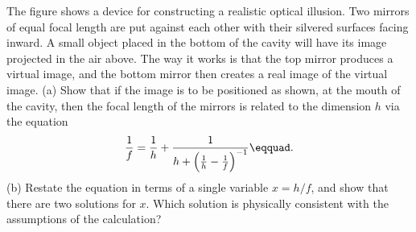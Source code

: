 The figure shows a device for constructing a realistic
optical illusion. Two mirrors of equal focal length are put
against each other with their silvered surfaces facing
inward. A small object placed in the bottom of the cavity
will have its image projected in the air above. The way it
works is that the top mirror produces a virtual image, and
the bottom mirror then creates a real image of the virtual
image. (a) Show that if the image is to be positioned as
shown, at the mouth of the cavity, then the focal length of
the mirrors is related to the dimension $h$ via the equation
\begin{equation*}
                \frac{1}{f}    = \frac{1}{h}+\frac{1}{h+\left(\frac{1}{h}-\frac{1}{f}\right)^{-1}}\eqquad.
\end{equation*}
(b) Restate the equation in terms of a single variable
$x=h/f$, and show that there are two solutions for $x$.
Which solution is physically consistent with the assumptions of the calculation?
